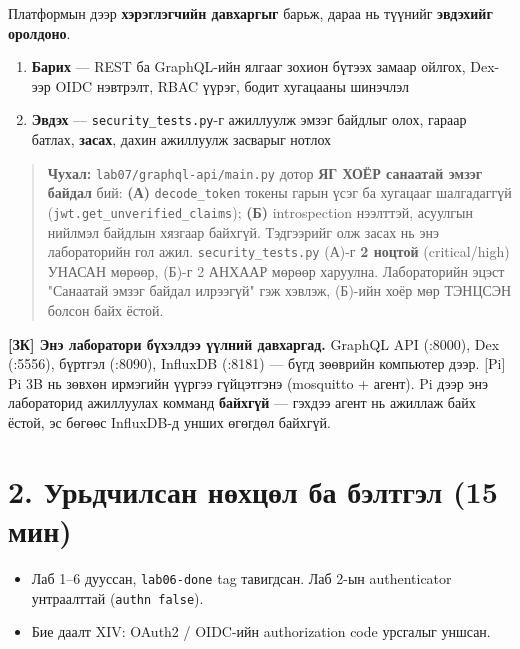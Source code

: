 Платформын дээр \textbf{хэрэглэгчийн давхаргыг} барьж, дараа нь түүнийг \textbf{эвдэхийг оролдоно}.

\begin{enumerate}
\def\labelenumi{\arabic{enumi}.}
\tightlist
\item
  \textbf{Барих} --- REST ба GraphQL-ийн ялгааг зохион бүтээх замаар ойлгох, Dex-ээр OIDC нэвтрэлт, RBAC үүрэг, бодит хугацааны шинэчлэл
\item
  \textbf{Эвдэх} --- \texttt{security\_\allowbreak{}tests.\allowbreak{}py}-г ажиллуулж эмзэг байдлыг олох, гараар батлах, \textbf{засах}, дахин ажиллуулж засварыг нотлох
\end{enumerate}

\begin{quote}
\textbf{Чухал:} \texttt{lab07/\allowbreak{}graphql-api/\allowbreak{}main.\allowbreak{}py} дотор \textbf{ЯГ ХОЁР санаатай эмзэг байдал} бий: \textbf{(А)} \texttt{decode\_token} токены гарын үсэг ба хугацааг шалгадаггүй (\texttt{jwt.\allowbreak{}get\_\allowbreak{}unverified\_\allowbreak{}claims}); \textbf{(Б)} introspection нээлттэй, асуулгын нийлмэл байдлын хязгаар байхгүй. Тэдгээрийг олж засах нь энэ лабораторийн гол ажил. \texttt{security\_\allowbreak{}tests.\allowbreak{}py} (А)-г \textbf{2 ноцтой} (critical/high) УНАСАН мөрөөр, (Б)-г 2 АНХААР мөрөөр харуулна. Лабораторийн эцэст "Санаатай эмзэг байдал илрээгүй" гэж хэвлэж, (Б)-ийн хоёр мөр ТЭНЦСЭН болсон байх ёстой.
\end{quote}

\textbf{{[}ЗК{]} Энэ лаборатори бүхэлдээ үүлний давхаргад.} GraphQL API (:8000), Dex (:5556), бүртгэл (:8090), InfluxDB (:8181) --- бүгд зөөврийн компьютер дээр. {[}Pi{]} Pi 3B нь зөвхөн ирмэгийн үүргээ гүйцэтгэнэ (mosquitto + агент). Pi дээр энэ лабораторид ажиллуулах комманд \textbf{байхгүй} --- гэхдээ агент нь ажиллаж байх ёстой, эс бөгөөс InfluxDB-д унших өгөгдөл байхгүй.

\hypertarget{ux443ux440ux44cux434ux447ux438ux43bux441ux430ux43d-ux43dux4e9ux445ux446ux4e9ux43b-ux431ux430-ux431ux44dux43bux442ux433ux44dux43b-15-ux43cux438ux43d}{%
\section{2. Урьдчилсан нөхцөл ба бэлтгэл (15 мин)}\label{ux443ux440ux44cux434ux447ux438ux43bux441ux430ux43d-ux43dux4e9ux445ux446ux4e9ux43b-ux431ux430-ux431ux44dux43bux442ux433ux44dux43b-15-ux43cux438ux43d}}

\begin{itemize}
\tightlist
\item
  Лаб 1--6 дууссан, \texttt{lab06-done} tag тавигдсан. Лаб 2-ын authenticator унтраалттай (\texttt{authn\ false}).
\item
  Бие даалт XIV: OAuth2 / OIDC-ийн authorization code урсгалыг уншсан.
\end{itemize}

